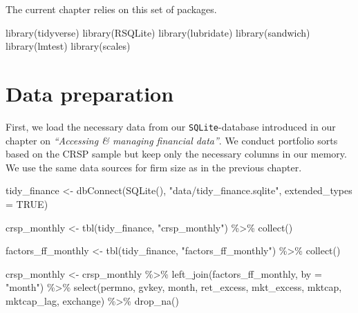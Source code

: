 \documentclass[
]{krantz}
\newenvironment{Shaded}{\begin{snugshade}}{\end{snugshade}}
\newcommand{\AttributeTok}[1]{\textcolor[rgb]{0.61,0.61,0.61}{#1}}
\newcommand{\ConstantTok}[1]{\textcolor[rgb]{0,0,0}{#1}}
\newcommand{\FunctionTok}[1]{\textcolor[rgb]{0,0,0}{#1}}
\newcommand{\NormalTok}[1]{#1}
\newcommand{\OtherTok}[1]{\textcolor[rgb]{0.37,0.37,0.37}{#1}}
\newcommand{\SpecialCharTok}[1]{\textcolor[rgb]{0,0,0}{#1}}
\newcommand{\StringTok}[1]{\textcolor[rgb]{0.5,0.5,0.5}{#1}}
\begin{document}
The current chapter relies on this set of packages.

\begin{Shaded}
\begin{Highlighting}[]
\FunctionTok{library}\NormalTok{(tidyverse)}
\FunctionTok{library}\NormalTok{(RSQLite)}
\FunctionTok{library}\NormalTok{(lubridate)}
\FunctionTok{library}\NormalTok{(sandwich)}
\FunctionTok{library}\NormalTok{(lmtest)}
\FunctionTok{library}\NormalTok{(scales)}
\end{Highlighting}
\end{Shaded}

\hypertarget{data-preparation-2}{%
\section{Data preparation}\label{data-preparation-2}}

First, we load the necessary data from our \texttt{SQLite}-database introduced in our chapter on \emph{``Accessing \& managing financial data''}. We conduct portfolio sorts based on the CRSP sample but keep only the necessary columns in our memory. We use the same data sources for firm size as in the previous chapter.

\begin{Shaded}
\begin{Highlighting}[]
\NormalTok{tidy\_finance }\OtherTok{\textless{}{-}} \FunctionTok{dbConnect}\NormalTok{(}\FunctionTok{SQLite}\NormalTok{(), }\StringTok{"data/tidy\_finance.sqlite"}\NormalTok{, }
                          \AttributeTok{extended\_types =} \ConstantTok{TRUE}\NormalTok{)}

\NormalTok{crsp\_monthly }\OtherTok{\textless{}{-}} \FunctionTok{tbl}\NormalTok{(tidy\_finance, }\StringTok{"crsp\_monthly"}\NormalTok{) }\SpecialCharTok{\%\textgreater{}\%}
  \FunctionTok{collect}\NormalTok{()}

\NormalTok{factors\_ff\_monthly }\OtherTok{\textless{}{-}} \FunctionTok{tbl}\NormalTok{(tidy\_finance, }\StringTok{"factors\_ff\_monthly"}\NormalTok{) }\SpecialCharTok{\%\textgreater{}\%}
  \FunctionTok{collect}\NormalTok{()}

\NormalTok{crsp\_monthly }\OtherTok{\textless{}{-}}\NormalTok{ crsp\_monthly }\SpecialCharTok{\%\textgreater{}\%}
  \FunctionTok{left\_join}\NormalTok{(factors\_ff\_monthly, }\AttributeTok{by =} \StringTok{"month"}\NormalTok{) }\SpecialCharTok{\%\textgreater{}\%}
  \FunctionTok{select}\NormalTok{(permno, gvkey, month, ret\_excess, mkt\_excess, }
\NormalTok{         mktcap, mktcap\_lag, exchange) }\SpecialCharTok{\%\textgreater{}\%}
  \FunctionTok{drop\_na}\NormalTok{()}
\end{Highlighting}
\end{Shaded}
\end{document}
